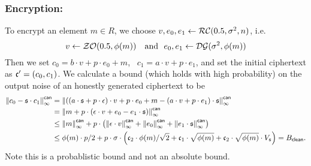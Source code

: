 \subsubsection{Encryption:}
To encrypt an element $m\in R$, we choose $v, e_0, e_1 \leftarrow \mathcal{RC}(0.5,\sigma^2,n)$, i.e.
\[
v \leftarrow \mathcal{ZO}(0.5, \phi(m)) ~~~\mbox{and}~~ e_0,e_1 \leftarrow \mathcal{DG}(\sigma^2,\phi(m)) 
\]
Then we set $c_0 = b \cdot v + p \cdot e_0+m$,~ $c_1=a\cdot v+p\cdot
e_1$, and set the initial ciphertext as $\mathfrak{c}'=(c_0,c_1)$.
We calculate a bound (which holds with high probability) on the output noise of
an honestly generated ciphertext to be
\begin{align*}
  {\Vert c_0 - \mathfrak{s}\cdot c_1 \Vert}_\infty^{\mathsf{can}} 
     &= {\Vert ((a \cdot \mathfrak{s}+ p \cdot \epsilon) \cdot v +p \cdot e_0 +m
                - (a \cdot v+ p \cdot e_1) \cdot \mathfrak{s}  \Vert}_\infty^{\mathsf{can}} \\
     &= {\Vert m + p \cdot (\epsilon \cdot v +e_0 - e_1 \cdot \mathfrak{s}) \Vert}_\infty^{\mathsf{can}} \\
     &\le {\Vert m \Vert}_\infty^{\mathsf{can}} 
         +p \cdot \left( {\Vert \epsilon\cdot v \Vert}_\infty^{\mathsf{can}}
                       + {\Vert e_0 \Vert}_\infty^{\mathsf{can}}
                       + {\Vert e_1 \cdot \mathfrak{s} \Vert}_\infty^{\mathsf{can}}
                  \right) \\
     &\le \phi(m) \cdot p/2
	  + p \cdot \sigma \cdot 
             \left( \mathfrak{c}_2 \cdot \phi(m) / \sqrt{2}
			  + \mathfrak{c}_1 \cdot \sqrt{\phi(m)}
			  + \mathfrak{c}_2 \cdot \sqrt{\phi(m)} \cdot V_{\mathfrak{s}}
		    \right) = B_{\mathsf{clean}}.
\end{align*}
Note this is a probablistic bound and not an absolute bound.

\vspace{5mm}

